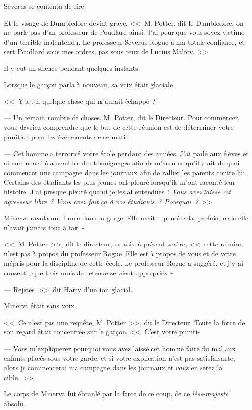 Severus se contenta de rire.

Et le visage de Dumbledore devint grave. <<~M. Potter, dit le Dumbledore, on ne parle pas d'un professeur de Poudlard ainsi. J'ai peur que vous soyez victime d'un terrible malentendu. Le professeur Severus Rogue a ma totale confiance, et sert Poudlard sous mes ordres, pas sous ceux de Lucius Malfoy.~>>

Il y eut un silence pendant quelques instants.

Lorsque le garçon parla à nouveau, sa voix était glaciale.

<<~Y a-t-il quelque chose qui m'aurait échappé~?

--- Un certain nombre de choses, M. Potter, dit le Directeur. Pour commencer, vous devriez comprendre que le but de cette réunion est de déterminer votre punition pour les événements de ce matin.

--- Cet homme a terrorisé votre école pendant des années. J'ai parlé aux élèves et ai commencé à assembler des témoignages afin de m'assurer qu'il y ait de quoi commencer une campagne dans les journaux afin de rallier les parents contre lui. Certains des étudiants les plus jeunes ont pleuré lorsqu'ils m'ont raconté leur histoire. J'ai presque pleuré quand je les ai entendues~! \emph{Vous avez laissé cet agresseur libre~? Vous avez fait ça à vos étudiants~? Pourquoi~?}~>>

Minerva ravala une boule dans sa gorge. Elle avait~- pensé cela, parfois, mais elle n'avait jamais tout à fait~-

<<~M. Potter~>>, dit le directeur, sa voix à présent sévère, <<~cette réunion n'est pas à propos du professeur Rogue. Elle est à propos de vous et de votre mépris pour la discipline de cette école. Le professeur Rogue a suggéré, et j'y ai consenti, que trois mois de retenue seraient appropriés~-

--- Rejetés~>>, dit Harry d'un ton glacial.

Minerva était sans voix.

<<~Ce n'est pas une requête, M. Potter~>>, dit le Directeur. Toute la force de son regard était concentrée sur le garçon. <<~C'est votre puniti-

--- Vous m'expliquerez pourquoi vous avez laissé cet homme faire du mal aux enfants placés sous votre garde, et si votre explication n'est pas satisfaisante, alors je commencerai ma campagne dans les journaux et \emph{vous} en serez la cible.~>>

Le corps de Minerva fut ébranlé par la force de ce coup, de ce \emph{lèse-majesté} absolu.

